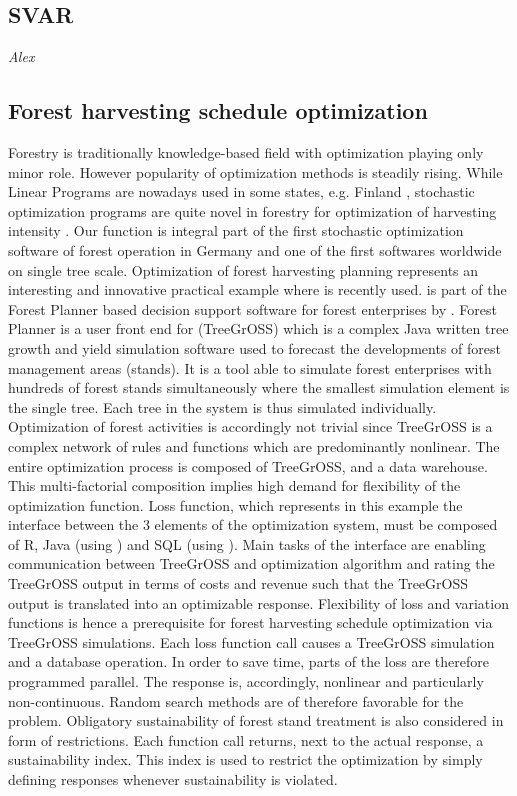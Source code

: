 \subsection{SVAR}
\textit{Alex}

\subsection{Forest harvesting schedule optimization}
Forestry is traditionally knowledge-based field with optimization playing only minor role. However popularity of optimization methods is steadily rising. While Linear Programs are nowadays used in some states, e.g. Finland \citep{redsven_2012}, stochastic optimization programs are quite novel in forestry for optimization of harvesting intensity \citep{kangas_2015}. Our function is integral part of the first stochastic optimization software of forest operation in Germany and one of the first softwares worldwide on single tree scale. Optimization of forest harvesting planning represents an interesting and innovative practical example where  is recently used.  is part of the Forest Planner based decision support software for forest enterprises by \citet{hansen_2014}. Forest Planner is a user front end for  (TreeGrOSS) which is a complex Java written tree growth and yield simulation software used to forecast the developments of forest management areas (stands). It is a tool able to simulate forest enterprises with hundreds of forest stands simultaneously where the smallest simulation element is the single tree. Each tree in the system is thus simulated individually. Optimization of forest activities is accordingly not trivial since TreeGrOSS is a complex network of rules and functions which are predominantly nonlinear. The entire optimization process is composed of TreeGrOSS,  and a data warehouse. This multi-factorial composition implies high demand for flexibility of the optimization function. Loss function, which represents in this example the interface between the 3 elements of the optimization system, must be composed of R, Java (using ) and SQL (using ). Main tasks of the interface are enabling communication between TreeGrOSS and optimization algorithm and rating the TreeGrOSS output in terms of costs and revenue such that the TreeGrOSS output is translated into an optimizable response. Flexibility of loss and variation functions is hence a prerequisite for forest harvesting schedule optimization via TreeGrOSS simulations. Each loss function call causes a TreeGrOSS simulation and a database operation. In order to save time, parts of the loss are therefore programmed parallel. The response is, accordingly, nonlinear and particularly non-continuous. Random search methods are of therefore favorable for the problem. Obligatory sustainability of forest stand treatment is also considered in form of restrictions. Each function call returns, next to the actual response, a sustainability index. This index is used to restrict the optimization by simply defining  responses whenever sustainability is violated.


